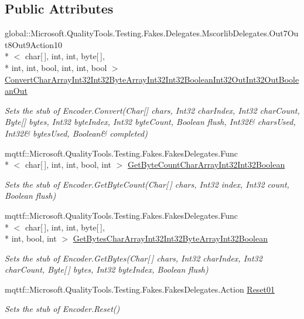 \subsection*{Public Attributes}
\begin{DoxyCompactItemize}
\item 
global\-::\-Microsoft.\-Quality\-Tools.\-Testing.\-Fakes.\-Delegates.\-Mscorlib\-Delegates.\-Out7\-Out8\-Out9\-Action10\\*
$<$ char\mbox{[}$\,$\mbox{]}, int, int, byte\mbox{[}$\,$\mbox{]}, \\*
int, int, bool, int, int, bool $>$ \hyperlink{class_system_1_1_text_1_1_fakes_1_1_stub_encoder_a08bbc1bdf8c92f73247ffce1cda6fb8b}{Convert\-Char\-Array\-Int32\-Int32\-Byte\-Array\-Int32\-Int32\-Boolean\-Int32\-Out\-Int32\-Out\-Boolean\-Out}
\begin{DoxyCompactList}\small\item\em Sets the stub of Encoder.\-Convert(Char\mbox{[}\mbox{]} chars, Int32 char\-Index, Int32 char\-Count, Byte\mbox{[}\mbox{]} bytes, Int32 byte\-Index, Int32 byte\-Count, Boolean flush, Int32\& chars\-Used, Int32\& bytes\-Used, Boolean\& completed)\end{DoxyCompactList}\item 
mqttf\-::\-Microsoft.\-Quality\-Tools.\-Testing.\-Fakes.\-Fakes\-Delegates.\-Func\\*
$<$ char\mbox{[}$\,$\mbox{]}, int, int, bool, int $>$ \hyperlink{class_system_1_1_text_1_1_fakes_1_1_stub_encoder_ab73a2811685408b1b05e3125d9092455}{Get\-Byte\-Count\-Char\-Array\-Int32\-Int32\-Boolean}
\begin{DoxyCompactList}\small\item\em Sets the stub of Encoder.\-Get\-Byte\-Count(\-Char\mbox{[}$\,$\mbox{]} chars, Int32 index, Int32 count, Boolean flush)\end{DoxyCompactList}\item 
mqttf\-::\-Microsoft.\-Quality\-Tools.\-Testing.\-Fakes.\-Fakes\-Delegates.\-Func\\*
$<$ char\mbox{[}$\,$\mbox{]}, int, int, byte\mbox{[}$\,$\mbox{]}, \\*
int, bool, int $>$ \hyperlink{class_system_1_1_text_1_1_fakes_1_1_stub_encoder_a14c09076337c98725d3497f5f7315378}{Get\-Bytes\-Char\-Array\-Int32\-Int32\-Byte\-Array\-Int32\-Boolean}
\begin{DoxyCompactList}\small\item\em Sets the stub of Encoder.\-Get\-Bytes(\-Char\mbox{[}$\,$\mbox{]} chars, Int32 char\-Index, Int32 char\-Count, Byte\mbox{[}$\,$\mbox{]} bytes, Int32 byte\-Index, Boolean flush)\end{DoxyCompactList}\item 
mqttf\-::\-Microsoft.\-Quality\-Tools.\-Testing.\-Fakes.\-Fakes\-Delegates.\-Action \hyperlink{class_system_1_1_text_1_1_fakes_1_1_stub_encoder_a854d016815a8224dd914db2200846525}{Reset01}
\begin{DoxyCompactList}\small\item\em Sets the stub of Encoder.\-Reset()\end{DoxyCompactList}\end{DoxyCompactItemize}
